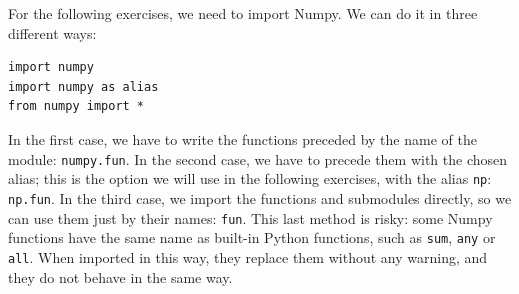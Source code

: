 For the following exercises, we need to import Numpy. We can do it in three different ways:
\begin{verbatim}
import numpy
import numpy as alias
from numpy import *
\end{verbatim}
In the first case, we have to write the functions preceded by the name of the module: \texttt{numpy.fun}. In the second case, we have to precede them with the chosen alias; this is the option we will use in the following exercises, with the alias \texttt{np}: \texttt{np.fun}. In the third case, we import the functions and submodules directly, so we can use them just by their names: \texttt{fun}. This last method is risky: some Numpy functions have the same name as built-in Python functions, such as \texttt{sum}, \texttt{any} or \texttt{all}. When imported in this way, they replace them without any warning, and they do not behave in the same way.
